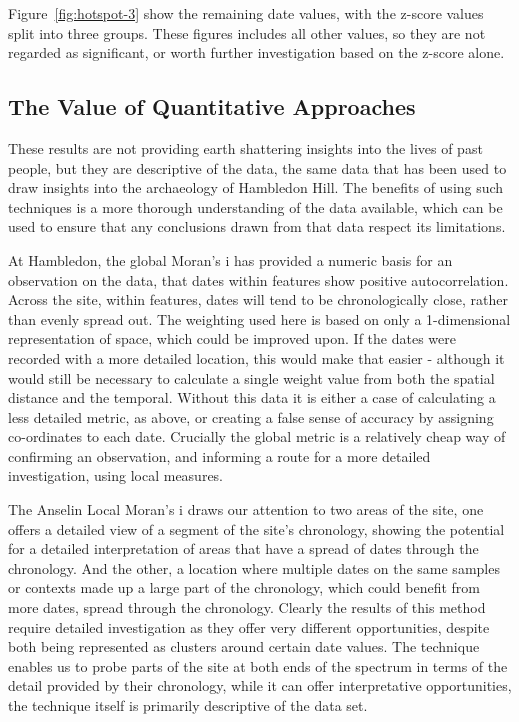 Figure~\ref{fig:hotspot-3} show the remaining date values, with the z-score values split into three groups. These figures includes all other values, so they are not regarded as significant, or worth further investigation based on the z-score alone.

\subsection{The Value of Quantitative Approaches}
These results are not providing earth shattering insights into the lives of past people, but they are descriptive of the data, the same data that has been used to draw insights into the archaeology of Hambledon Hill. The benefits of using such techniques is a more thorough understanding of the data available, which can be used to ensure that any conclusions drawn from that data respect its limitations. 

At Hambledon, the global Moran's i has provided a numeric basis for an observation on the data, that dates within features show positive autocorrelation. Across the site, within features, dates will tend to be chronologically close, rather than evenly spread out. The weighting used here is based on only a 1-dimensional representation of space, which could be improved upon. If the dates were recorded with a more detailed location, this would make that easier - although it would still be necessary to calculate a single weight value from both the spatial distance and the temporal. Without this data it is either a case of calculating a less detailed metric, as above, or creating a false sense of accuracy by assigning co-ordinates to each date. Crucially the global metric is a relatively cheap way of confirming an observation, and informing a route for a more detailed investigation, using local measures.

The Anselin Local Moran's i draws our attention to two areas of the site, one offers a detailed view of a segment of the site's chronology, showing the potential for a detailed interpretation of areas that have a spread of dates through the chronology. And the other, a location where multiple dates on the same samples or contexts made up a large part of the chronology, which could benefit from more dates, spread through the chronology. Clearly the results of this method require detailed investigation as they offer very different opportunities, despite both being represented as clusters around certain date values. The technique enables us to probe parts of the site at both ends of the spectrum in terms of the detail provided by their chronology, while it can offer interpretative opportunities, the technique itself is primarily descriptive of the data set.

